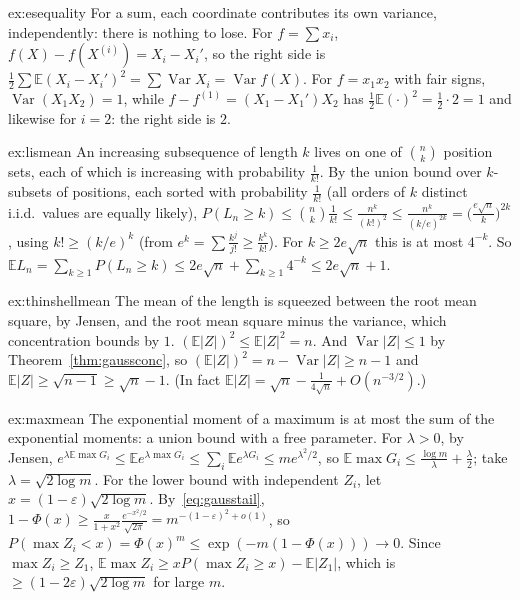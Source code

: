 \begin{solution}{ex:esequality}
\idea For a sum, each coordinate contributes its own variance, independently: there is nothing to lose.
\writeup For $f=\sum x_i$, $f(X)-f(X^{(i)})=X_i-X_i'$, so the right side is $\frac12\sum\mathbb E(X_i-X_i')^2=\sum\operatorname{Var}X_i=\operatorname{Var}f(X)$. For $f=x_1x_2$ with fair signs, $\operatorname{Var}(X_1X_2)=1$,
while $f-f^{(1)}=(X_1-X_1')X_2$ has $\frac12\mathbb E(\cdot)^2=\frac12\cdot2=1$ and likewise for $i=2$: the right side is $2$.
\end{solution}

\begin{solution}{ex:lismean}
\idea An increasing subsequence of length $k$ lives on one of $\binom nk$ position sets, each of which is increasing with probability $\frac1{k!}$.
\writeup By the union bound over $k$-subsets of positions, each sorted with probability $\frac1{k!}$ (all orders of $k$ distinct i.i.d.\ values are equally likely),
$P(L_n\ge k)\le\binom nk\frac1{k!}\le\frac{n^k}{(k!)^2}\le\frac{n^k}{(k/e)^{2k}}=\bigl(\frac{e\sqrt n}k\bigr)^{2k}$, using $k!\ge(k/e)^k$ (from $e^k=\sum\frac{k^j}{j!}\ge\frac{k^k}{k!}$). For $k\ge2e\sqrt n$ this is at most $4^{-k}$. So
$\mathbb EL_n=\sum_{k\ge1}P(L_n\ge k)\le2e\sqrt n+\sum_{k\ge1}4^{-k}\le2e\sqrt n+1$.
\end{solution}

\begin{solution}{ex:thinshellmean}
\idea The mean of the length is squeezed between the root mean square, by Jensen, and the root mean square minus the variance, which concentration bounds by $1$.
\writeup $(\mathbb E|Z|)^2\le\mathbb E|Z|^2=n$. And $\operatorname{Var}|Z|\le1$ by Theorem~\ref{thm:gaussconc}, so $(\mathbb E|Z|)^2=n-\operatorname{Var}|Z|\ge n-1$ and $\mathbb E|Z|\ge\sqrt{n-1}\ge\sqrt n-1$. (In
fact $\mathbb E|Z|=\sqrt n-\frac1{4\sqrt n}+O(n^{-3/2})$.)
\end{solution}

\begin{solution}{ex:maxmean}
\idea The exponential moment of a maximum is at most the sum of the exponential moments: a union bound with a free parameter.
\writeup For $\lambda>0$, by Jensen, $e^{\lambda\mathbb E\max G_i}\le\mathbb Ee^{\lambda\max G_i}\le\sum_i\mathbb Ee^{\lambda G_i}\le me^{\lambda^2/2}$, so $\mathbb E\max G_i\le\frac{\log m}\lambda+\frac\lambda2$; take $\lambda=\sqrt{2\log m}$.
For the lower bound with independent $Z_i$, let $x=(1-\varepsilon)\sqrt{2\log m}$. By~\eqref{eq:gausstail}, $1-\Phi(x)\ge\frac x{1+x^2}\frac{e^{-x^2/2}}{\sqrt{2\pi}}=m^{-(1-\varepsilon)^2+o(1)}$, so
$P(\max Z_i<x)=\Phi(x)^m\le\exp(-m(1-\Phi(x)))\to0$. Since $\max Z_i\ge Z_1$, $\mathbb E\max Z_i\ge xP(\max Z_i\ge x)-\mathbb E|Z_1|$, which is $\ge(1-2\varepsilon)\sqrt{2\log m}$ for large $m$.
\end{solution}

